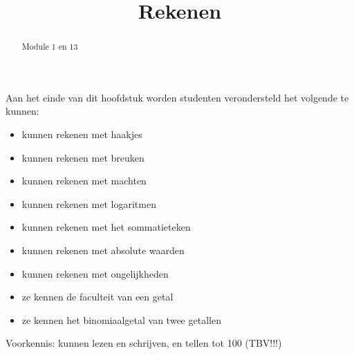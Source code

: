 \documentclass{ximera}
\title{Rekenen}
\begin{document}
\begin{abstract}
Module 1 en 13
\end{abstract}

\maketitle

\begin{sectionOutcomes}

Aan het einde van dit hoofdstuk worden studenten verondersteld het volgende te kunnen:

\begin{itemize}
\item kunnen rekenen met haakjes
\item kunnen rekenen met breuken
\item kunnen rekenen met machten
\item kunnen rekenen met logaritmen
\item kunnen rekenen met het sommatieteken	
\item kunnen rekenen met absolute waarden
\item kunnen rekenen met ongelijkheden 
\item ze kennen de faculteit van een getal
\item ze kennen het binomiaalgetal van twee getallen
\end{itemize}

Voorkennis: kunnen lezen en schrijven, en tellen tot 100 (TBV!!!)


\end{sectionOutcomes}
\end{document}
